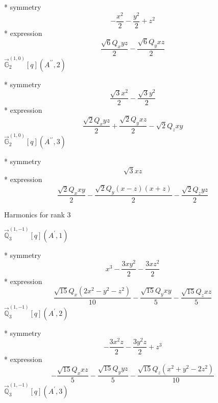 \documentclass[fleqn,8pt]{jsarticle}
\begin{document}
\noindent\quad ** symmetry
\begin{dmath*}
- \frac{x^{2}}{2} - \frac{y^{2}}{2} + z^{2}
\end{dmath*}
\noindent\quad ** expression
\begin{dmath*}
\frac{\sqrt{6} Q_{x} y z}{2} - \frac{\sqrt{6} Q_{y} x z}{2}
\end{dmath*}
\noindent\quad $\vec{\mathbb{G}}_{2}^{(1,0)}[q](A^{\prime\prime},2)$

\noindent\quad ** symmetry
\begin{dmath*}
\frac{\sqrt{3} x^{2}}{2} - \frac{\sqrt{3} y^{2}}{2}
\end{dmath*}
\noindent\quad ** expression
\begin{dmath*}
\frac{\sqrt{2} Q_{x} y z}{2} + \frac{\sqrt{2} Q_{y} x z}{2} - \sqrt{2} Q_{z} x y
\end{dmath*}
\noindent\quad $\vec{\mathbb{G}}_{2}^{(1,0)}[q](A^{\prime\prime},3)$

\noindent\quad ** symmetry
\begin{dmath*}
\sqrt{3} x z
\end{dmath*}
\noindent\quad ** expression
\begin{dmath*}
\frac{\sqrt{2} Q_{x} x y}{2} - \frac{\sqrt{2} Q_{y} \left(x - z\right) \left(x + z\right)}{2} - \frac{\sqrt{2} Q_{z} y z}{2}
\end{dmath*}

\noindent * Harmonics for rank 3

\noindent\quad $\vec{\mathbb{Q}}_{3}^{(1,-1)}[q](A^{\prime},1)$

\noindent\quad ** symmetry
\begin{dmath*}
x^{3} - \frac{3 x y^{2}}{2} - \frac{3 x z^{2}}{2}
\end{dmath*}
\noindent\quad ** expression
\begin{dmath*}
\frac{\sqrt{15} Q_{x} \left(2 x^{2} - y^{2} - z^{2}\right)}{10} - \frac{\sqrt{15} Q_{y} x y}{5} - \frac{\sqrt{15} Q_{z} x z}{5}
\end{dmath*}
\noindent\quad $\vec{\mathbb{Q}}_{3}^{(1,-1)}[q](A^{\prime},2)$

\noindent\quad ** symmetry
\begin{dmath*}
- \frac{3 x^{2} z}{2} - \frac{3 y^{2} z}{2} + z^{3}
\end{dmath*}
\noindent\quad ** expression
\begin{dmath*}
- \frac{\sqrt{15} Q_{x} x z}{5} - \frac{\sqrt{15} Q_{y} y z}{5} - \frac{\sqrt{15} Q_{z} \left(x^{2} + y^{2} - 2 z^{2}\right)}{10}
\end{dmath*}
\noindent\quad $\vec{\mathbb{Q}}_{3}^{(1,-1)}[q](A^{\prime},3)$
\end{document}
